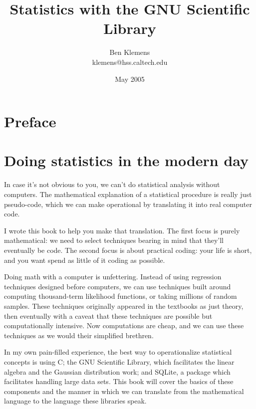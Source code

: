 \documentclass[12pt,notitlepage, openany]{book}
\begin{document}
\setlength{\textheight}{9in} 
\title{Statistics with the GNU Scientific Library}
\author{Ben Klemens\\klemens@hss.caltech.edu}
\date{May 2005}
\maketitle

\chapter*{Preface}


\tableofcontents \vfill\eject

\chapter[Introduction]{Doing statistics in the modern day}

In case it's not obvious to you, we can't do statistical analysis without
computers.  The mathematical explanation of a statistical procedure is
really just pseudo-code, which we can make operational by translating
it into real computer code.

I wrote this book to help you make that translation. The first focus is purely
mathematical: we need to select techniques bearing in mind that they'll eventually
be code. The second focus is about practical coding: your life
is short, and you want spend as little of it coding as possible.

Doing math with a computer is unfettering. Instead of using
regression techniques designed before computers, we can use techniques
built around computing thousand-term likelihood functions, or taking
millions of random samples. These techniques originally appeared in the textbooks as
just theory, then eventually with a caveat that these techniques are possible but
computationally intensive. Now computations are cheap, and we can 
use these techniques as we would their simplified brethren.

In my own pain-filled experience, the best way to operationalize statistical concepts
is using C; the GNU Scientific Library,  which facilitates the linear
algebra and the Gaussian distribution work; and SQLite, a package which
facilitates handling large data sets. This book will cover the basics
of these components and the manner in which we can translate from the
mathematical language to the language these libraries speak.
\end{document}
